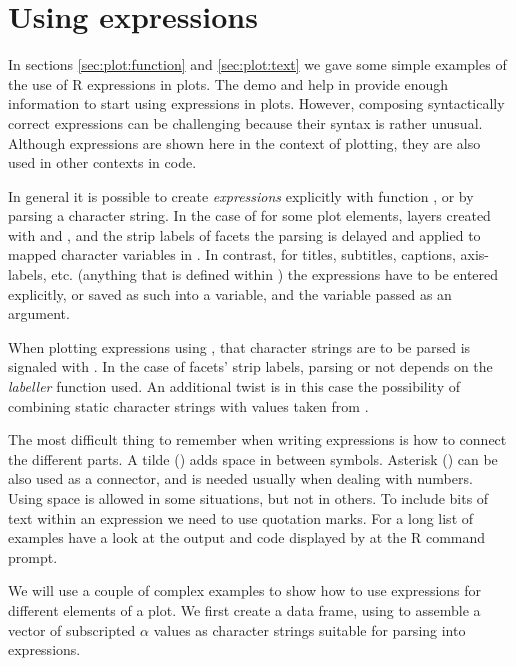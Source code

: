 \documentclass[krantz2]{krantz}\usepackage{knitr}
\begin{document}

\section[Using plotmath expressions]{Using  expressions}\label{sec:plot:plotmath}
In sections \ref{sec:plot:function} and \ref{sec:plot:text} we gave some simple examples of the use of R expressions in plots. The  demo and help in \Rlang provide enough information to start using expressions in plots. However, composing syntactically correct expressions can be challenging because their syntax is rather unusual. Although expressions are shown here in the context of plotting, they are also used in other contexts in \Rlang code.

In general it is possible to create \emph{expressions} explicitly with function , or by parsing a character string. In the case of \ggplot for some plot elements, layers created with  and , and the strip labels of facets the parsing is delayed and applied to mapped character variables in . In contrast, for titles, subtitles, captions, axis-labels, etc. (anything that is defined within ) the expressions have to be entered explicitly, or saved as such into a variable, and the variable passed as an argument.

When plotting expressions using , that character strings are to be parsed is signaled with . In the case of facets' strip labels, parsing or not depends on the \emph{labeller} function used. An additional twist is in this case the possibility of combining static character strings with values taken from .

The most difficult thing to remember when writing expressions is how to connect the different parts. A tilde (\code{\textasciitilde}) adds space in between symbols. Asterisk (\code{*}) can be also used as a connector, and is needed usually when dealing with numbers. Using space is allowed in some situations, but not in others. To include bits of text within an expression we need to use quotation marks. For a long list of examples have a look at the output and code displayed by  at the R command prompt.

We will use a couple of complex examples to show how to use expressions for different elements of a plot.
We first create a data frame, using  to assemble a vector of subscripted $\alpha$ values as character strings suitable for parsing into expressions.
\end{document}
